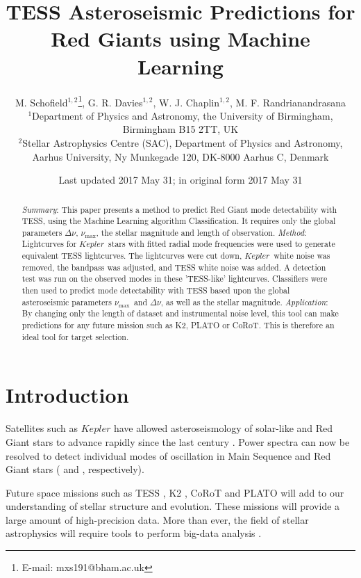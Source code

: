 \documentclass[a4paper,fleqn,usenatbib,useAMS]{mnras}
\title[TRG]{TESS Asteroseismic Predictions for Red Giants using Machine Learning}
\author[M. Schofield et al.]{M. Schofield$^{1, 2}$\thanks{E-mail: mxs191@bham.ac.uk}, G. R. Davies$^{1, 2}$, W. J. Chaplin$^{1, 2}$, M. F. Randrianandrasana
\\
$^{1}$Department of Physics and Astronomy, the University of Birmingham, Birmingham B15 2TT, UK \\
$^{2}$Stellar Astrophysics Centre (SAC), Department of Physics and Astronomy, Aarhus University, Ny Munkegade 120, DK-8000 Aarhus C, Denmark}
\date{Last updated 2017 May 31; in original form 2017 May 31}
\newcommand{\numax}{\ensuremath{\nu_{\textrm{max}}}}
\newcommand{\dnu}{\ensuremath{\Delta\nu}}
\newcommand{\kep}{\ensuremath{Kepler}\:}
\begin{document}
\label{firstpage}
\pagerange{\pageref{firstpage}--\pageref{lastpage}}
\maketitle

\begin{abstract}
{\it Summary}: This paper presents a method to predict Red Giant mode detectability with TESS, using the Machine Learning algorithm Classification. It requires only the global parameters \dnu, \numax, the stellar magnitude and length of observation. \newline
{\it Method}: Lightcurves for \kep \ stars with fitted radial mode frequencies were used to generate equivalent TESS lightcurves. The lightcurves were cut down, \kep \ white noise was removed, the bandpass was adjusted, and TESS white noise was added. A detection test was run on the observed modes in these 'TESS-like' lightcurves. Classifiers were then used to predict mode detectability with TESS based upon the global asteroseismic parameters \numax \ and \dnu, as well as the stellar magnitude.\newline
{\it Application}: By changing only the length of dataset and instrumental noise level, this tool can make predictions for any future mission such as K2, PLATO or CoRoT. This is therefore an ideal tool for target selection.
\end{abstract}


\section{Introduction}

Satellites such as $Kepler$ have allowed asteroseismology of solar-like and Red Giant stars to advance rapidly since the last century \citet{chaplin_asteroseismology_2013}. Power spectra can now be resolved to detect individual modes of oscillation in Main Sequence and Red Giant stars (\citet{lund_standing_2017} and \citet{davies_asteroseismology_2016}, respectively).

Future space missions such as TESS \citep{ricker_transiting_2014}, K2 \citep{howell_k2_2014}, CoRoT \citep{baglin_corot:_2006} and PLATO \citep{rauer_plato_2014} will add to our understanding of stellar structure and evolution. These missions will provide a large amount of high-precision data. More than ever, the field of stellar astrophysics will require tools to perform big-data analysis \citep{kremer_big_2017}. 
\end{document}
